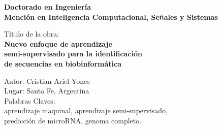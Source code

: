 \newpage
\thispagestyle{empty}

\noindent \textbf{\Large Doctorado en Ingeniería}\\
\noindent\textbf{\large Mención en Inteligencia Computacional, Señales y Sistemas}\\

\vspace{1cm}

\noindent\textrm{\large Título de la obra:}\\[0.2 cm]
\noindent\textbf{\Large
Nuevo enfoque de aprendizaje\\[0.1 cm]
semi-supervisado para la identificación\\[0.1 cm]
de secuencias en biobinformática}\\

\vspace{1cm}

\noindent\textrm{\large Autor: Cristian Ariel Yones}\\[0.6 cm]
\noindent\textrm{\large Lugar: Santa Fe, Argentina}\\[0.6 cm]
\noindent\textrm{\large Palabras Claves: }\\[0.6 cm]
\noindent\textrm{\large
aprendizaje maquinal, aprendizaje semi-supervisado, \\ predicción de microRNA, genoma completo.}

